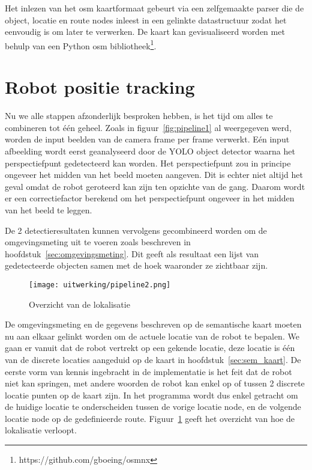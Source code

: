 Het inlezen van het \gls{osm} kaartformaat gebeurt via een zelfgemaakte parser die de object, locatie en route nodes inleest in een gelinkte datastructuur
zodat het eenvoudig is om later te verwerken.
De kaart kan gevisualiseerd worden met behulp van een Python \gls{osm} bibliotheek\footnote{https://github.com/gboeing/osmnx}.


\section{Robot positie tracking}\label{sec:lokalisatie}
Nu we alle stappen afzonderlijk besproken hebben, is het tijd om alles te combineren tot \'{e}\'{e}n geheel.
Zoals in figuur~\ref{fig:pipeline1} al weergegeven werd, worden de input beelden van de camera frame per frame verwerkt.
E\'{e}n input afbeelding wordt eerst geanalyseerd door de YOLO object detector waarna het perspectiefpunt gedetecteerd kan worden.
Het perspectiefpunt zou in principe ongeveer het midden van het beeld moeten aangeven.
Dit is echter niet altijd het geval omdat de robot geroteerd kan zijn ten opzichte van de gang.
Daarom wordt er een correctiefactor berekend om het perspectiefpunt ongeveer in het midden van het beeld te leggen.

De 2 detectieresultaten kunnen vervolgens gecombineerd worden om de omgevingsmeting uit te voeren zoals beschreven in hoofdstuk~\ref{sec:omgevingsmeting}.
Dit geeft als resultaat een lijst van gedetecteerde objecten samen met de hoek waaronder ze zichtbaar zijn.

\begin{figure}[t]
    \centering
    \texttt{[image: uitwerking/pipeline2.png]}
    \caption{Overzicht van de lokalisatie}
    \label{fig:pipeline2}
\end{figure}

De omgevingsmeting en de gegevens beschreven op de semantische kaart moeten nu aan elkaar gelinkt worden om de actuele locatie van de robot te bepalen.
We gaan er vanuit dat de robot vertrekt op een gekende locatie, deze locatie is \'{e}\'{e}n van de discrete locaties aangeduid op de kaart in hoofdstuk~\ref{sec:sem_kaart}.
De eerste vorm van kennis ingebracht in de implementatie is het feit dat de robot niet kan springen, met andere woorden de robot kan enkel op of tussen 2 discrete locatie punten op de kaart zijn.
In het programma wordt dus enkel getracht om de huidige locatie te onderscheiden tussen de vorige locatie node, en de volgende locatie node op de gedefinieerde route.
Figuur~\ref{fig:pipeline2} geeft het overzicht van hoe de lokalisatie verloopt.

